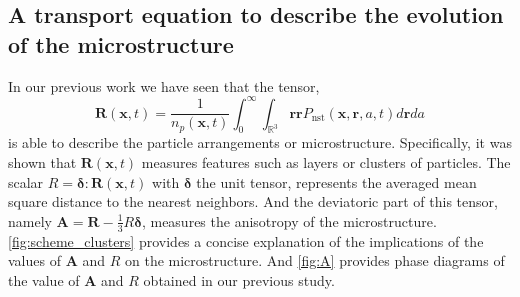 \subsection{A transport equation to describe the evolution of the microstructure}

In our previous work \citep{fintzi2024buoyancy} we have seen that the tensor,
\begin{equation}
    \textbf{R}(\textbf{x},t)
    = \frac{1}{n_p(\textbf{x},t)}
    \int_0^\infty 
    \int_{\mathbb{R}^3}
    \textbf{rr}
    P_\text{nst}(\textbf{x},\textbf{r},a,t)
    d\textbf{r}
    da
    \label{eq:R}
\end{equation}
is able to describe the particle arrangements or microstructure.
Specifically, it was shown that $\textbf{R}(\textbf{x},t)$ measures features such as layers or clusters of particles. 
The scalar $R = \bm\delta:\textbf{R}(\textbf{x},t)$ with $\bm\delta$ the unit tensor, represents the averaged mean square distance to the nearest neighbors.
And the deviatoric part of this tensor, namely $\textbf{A} = \textbf{R}-\frac{1}{3}R\bm\delta$, measures the anisotropy of the microstructure. 
\ref{fig:scheme_clusters} provides a concise explanation of the implications of the values of $\textbf{A}$ and $R$ on the microstructure.  
And \ref{fig:A} provides phase diagrams of the value of $\textbf{A}$ and $R$ obtained in our previous study. 
